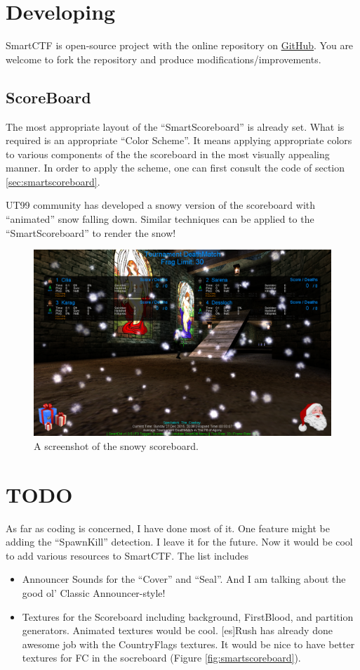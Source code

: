 \documentclass{article}
\begin{document}
\section{Developing}
SmartCTF is open-source project with the online repository on \href{https://github.com/ravimohan1991/SmartCTF}{{\color{Blue}GitHub}}.  You are welcome to fork the repository and produce modifications/improvements.
\subsection{ScoreBoard}
The most appropriate layout of the ``SmartScoreboard'' is already set.  What is required is an appropriate ``Color Scheme''.  It means applying appropriate colors to various components of the the scoreboard in the most visually appealing manner.  In order to apply the scheme, one can first consult the code of section \ref{sec:smartscoreboard}.

UT99 community has developed a snowy version of the scoreboard with ``animated'' snow falling down.  Similar techniques can be applied to the ``SmartScoreboard'' to render the snow!

\begin{figure}
\centering
\label{fig:snowyscoreboard}
\includegraphics[width=1.1\textwidth]{snowy}
\caption{A screenshot of the snowy scoreboard.}
\end{figure}


\section{TODO}
As far as coding is concerned, I have done most of it.  One feature might be adding the ``SpawnKill'' detection.  I leave it for the future.
Now it would be cool to add various resources to SmartCTF.  The list includes
\begin{itemize}
\item Announcer Sounds for the ``Cover'' and ``Seal''.  And I am talking about the good ol' Classic Announcer-style!
\item Textures for the Scoreboard including background, FirstBlood, and partition generators.  Animated textures would be cool.  {[es]}Rush has already done awesome job with the CountryFlags textures.  It would be nice to have better textures for FC in the socreboard (Figure \ref{fig:smartscoreboard}).
\end{itemize}
\end{document}
